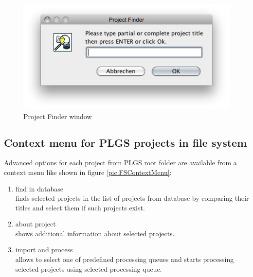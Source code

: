 \documentclass[]{article}
\providecommand{\tightlist}{%
  \setlength{\itemsep}{0pt}\setlength{\parskip}{0pt}}
\begin{document}
\begin{figure}[htbp]
\centering
\includegraphics{pic/project_finder.png}
\caption{Project Finder window \label{pic:FinderWindow}}
\end{figure}

\clearpage

\subsection{Context menu for PLGS projects in file
system}\label{context-menu-for-plgs-projects-in-file-system}

Advanced options for each project from PLGS root folder are available
from a context menu like shown in figure \ref{pic:FSContextMenu}:

\begin{enumerate}
\def\labelenumi{\arabic{enumi}.}
\tightlist
\item
  find in database\\
  finds selected projects in the list of projects from database by
  comparing their titles and select them if such projects exist.
\item
  about project\\
  shows additional information about selected projects.
\item
  import and process\\
  allows to select one of predefined processing queues and starts
  processing selected projects using selected processing queue.
\end{enumerate}
\end{document}
